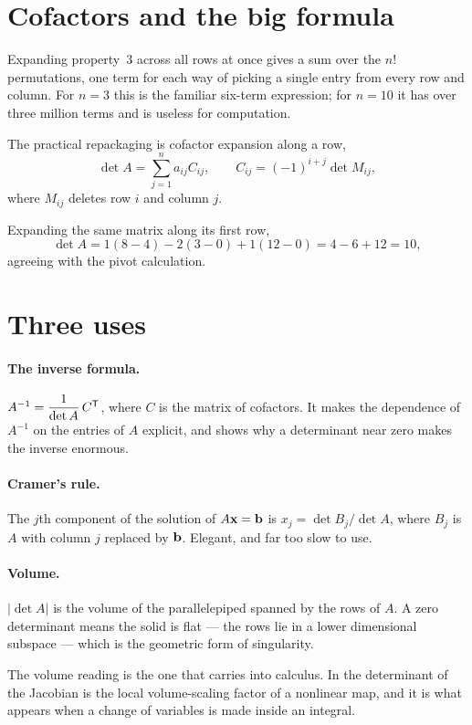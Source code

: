 \section{Cofactors and the big formula}

Expanding property~3 across all rows at once gives a sum over the \(n!\)
permutations, one term for each way of picking a single entry from every row and
column. For \(n=3\) this is the familiar six-term expression; for \(n=10\) it has
over three million terms and is useless for computation.

The practical repackaging is cofactor expansion along a row,
\[
	\det A=\sum_{j=1}^{n}a_{ij}C_{ij},
	\qquad
	C_{ij}=(-1)^{i+j}\det M_{ij},
\]
where \(M_{ij}\) deletes row \(i\) and column \(j\).

\begin{example}
Expanding the same matrix along its first row,
\[
	\det A=1(8-4)-2(3-0)+1(12-0)=4-6+12=10,
\]
agreeing with the pivot calculation.
\end{example}


\section{Three uses}

\paragraph{The inverse formula.}
\(A^{-1}=\dfrac{1}{\det A}\,C^{\mathsf{T}}\), where \(C\) is the matrix of cofactors. It
makes the dependence of \(A^{-1}\) on the entries of \(A\) explicit, and shows
why a determinant near zero makes the inverse enormous.

\paragraph{Cramer's rule.}
The \(j\)th component of the solution of \(A\mathbf{x}=\mathbf{b}\) is
\(x_j=\det B_j/\det A\), where \(B_j\) is \(A\) with column \(j\) replaced by
\(\mathbf{b}\). Elegant, and far too slow to use.

\paragraph{Volume.}
\(|\det A|\) is the volume of the parallelepiped spanned by the rows of \(A\).
A zero determinant means the solid is flat --- the rows lie in a lower
dimensional subspace --- which is the geometric form of singularity.

\begin{remark}
The volume reading is the one that carries into calculus. In
 the determinant of the Jacobian is the local
volume-scaling factor of a nonlinear map, and it is what appears when a change of
variables is made inside an integral.
\end{remark}
